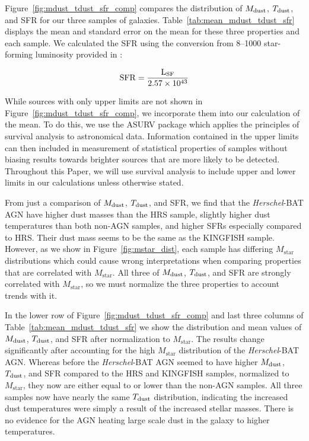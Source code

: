 \documentclass[fleqn, usenatbib]{mnras}
\newcommand{\herschel}{\emph{Herschel}}
\newcommand{\mstar}{$M_{\mathrm{star}}$}
\newcommand{\mdust}{$M_{\rm dust}$}
\newcommand{\tdust}{$T_{\rm dust}$}
\begin{document}
Figure~\ref{fig:mdust_tdust_sfr_comp} compares the distribution of \mdust, \tdust, and SFR for our three samples of galaxies. Table~\ref{tab:mean_mdust_tdust_sfr} displays the mean and standard error on the mean for these three properties and each sample. We calculated the SFR using the conversion from 8--1000 \micron{} star-forming luminosity provided in  \citet{Murphy:2011rt}:

\begin{equation}\label{eq:sfr_ir}
\rm{SFR} = \frac{L_{\rm SF}}{2.57\times10^{43}}
\end{equation}

While sources with only upper limits are not shown in Figure~\ref{fig:mdust_tdust_sfr_comp}, we incorporate them into our calculation of the mean. To do this, we use the ASURV \citep{Feigelson:1985lr} package which applies the principles of survival analysis to astronomical data. Information contained in the upper limits can then included in measurement of statistical properties of samples without biasing results towards brighter sources that are more likely to be detected. Throughout this Paper, we will use survival analysis to include upper and lower limits in our calculations unless otherwise stated. 

From just a comparison of \mdust, \tdust, and SFR, we find that the \herschel-BAT AGN have higher dust masses than the HRS sample, slightly higher dust temperatures than both non-AGN samples, and higher SFRs especially compared to HRS. Their dust mass seems to be the same as the KINGFISH sample. However, as we show in Figure~\ref{fig:mstar_dist}, each sample has differing \mstar{} distributions which could cause wrong interpretations when comparing properties that are correlated with \mstar. All three of \mdust, \tdust, and SFR are strongly correlated with \mstar, so we must normalize the three properties to account trends with it.

In the lower row of Figure~\ref{fig:mdust_tdust_sfr_comp} and last three columns of Table~\ref{tab:mean_mdust_tdust_sfr} we show the distribution and mean values of \mdust, \tdust, and SFR after normalization to \mstar. The results change significantly after accounting for the high \mstar{} distribution of the \herschel-BAT AGN. Whereas before the \herschel-BAT AGN seemed to have higher \mdust, \tdust, and SFR compared to the HRS and KINGFISH samples, normalized to \mstar, they now are either equal to or lower than the non-AGN samples. All three samples now have nearly the same \tdust{} distribution, indicating the increased dust temperatures were simply a result of the increased stellar masses. There is no evidence for the AGN heating large scale dust in the galaxy to higher temperatures. 
\end{document}

